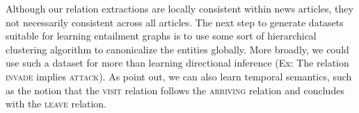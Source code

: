 Although our relation extractions are locally consistent within
news articles, they not necessarily consistent across all articles.
The next step to generate datasets suitable for learning entailment
graphs is to use some sort of hierarchical clustering
algorithm to canonicalize the entities globally. More broadly,
we could use such a dataset for more than learning directional
inference (Ex: The relation \textsc{invade} implies \textsc{attack}). 
As \citet{lewis2014semantics} point out, we can also learn temporal
semantics, such as the notion that the \textsc{visit} relation follows the  
\textsc{arriving} relation and concludes with the \textsc{leave} relation.

